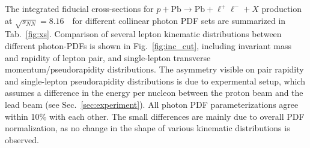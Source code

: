 The integrated fiducial cross-sections for $p+\textrm{Pb}\rightarrow \textrm{Pb} + \ell^+\ell^- + X$ production at $\sqrt{s_{N N}} = 8.16$~\TeV\ for different collinear photon PDF sets are summarized in Tab.~\ref{fig:xs}.
Comparison of several lepton kinematic distributions between different photon-PDFs is shown in Fig.~\ref{fig:inc_cut}, including invariant mass and rapidity of lepton pair, and single-lepton transverse momentum/pseudorapidity distributions. 
The asymmetry visible on pair rapidity and single-lepton pseudorapidity distributions is due to expermental setup, which assumes a difference in the energy per nucleon between the proton beam and the lead beam (see Sec.~\ref{sec:experiment}).
All photon PDF parameterizations agree within 10\% with each other.
The small differences are mainly due to overall PDF normalization, as no change in the shape of various kinematic distributions is observed.

%
%

